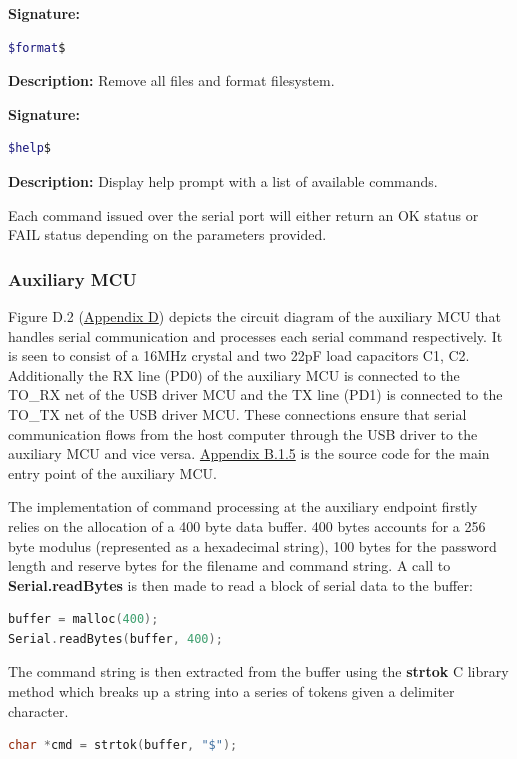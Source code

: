 \textbf{Signature: } 
\begin{lstlisting}[language=bash]
$format$
\end{lstlisting}
\textbf{Description: }  \linebreak
Remove all files and format filesystem.

\textbf{Signature: } 
\begin{lstlisting}[language=bash]
$help$
\end{lstlisting}
\textbf{Description: }  \linebreak
Display help prompt with a list of available commands.

Each command issued over the serial port will either return an OK status or FAIL status depending on the parameters provided.

\subsubsection{Auxiliary MCU}

Figure D.2 (\hyperref[sec:appd2]{Appendix D}) depicts the circuit diagram of the auxiliary MCU that handles serial communication and processes each serial command respectively. It is seen to consist of a 16MHz crystal and two 22pF load capacitors C1, C2. Additionally the RX line (PD0) of the auxiliary MCU is connected to the TO\_RX net of the USB driver MCU and the TX line (PD1) is connected to the TO\_TX net of the USB driver MCU. These connections ensure that serial communication flows from the host computer through the USB driver to the auxiliary MCU and vice versa. \hyperref[sec:comm]{Appendix B.1.5} is the source code for the main entry point of the auxiliary MCU.

The implementation of command processing at the auxiliary endpoint firstly relies on the allocation of a 400 byte data buffer. 400 bytes accounts for a 256 byte modulus (represented as a hexadecimal string), 100 bytes for the password length and reserve bytes for the filename and command string. A call to \textbf{Serial.readBytes} is then made to read a block of serial data to the buffer:

\begin{lstlisting}[language=C]
buffer = malloc(400);
Serial.readBytes(buffer, 400);
\end{lstlisting}

The command string is then extracted from the buffer using the \textbf{strtok} C library method which breaks up a string into a series of tokens given a delimiter character.
\begin{lstlisting}[language=C]
char *cmd = strtok(buffer, "$");
\end{lstlisting}

